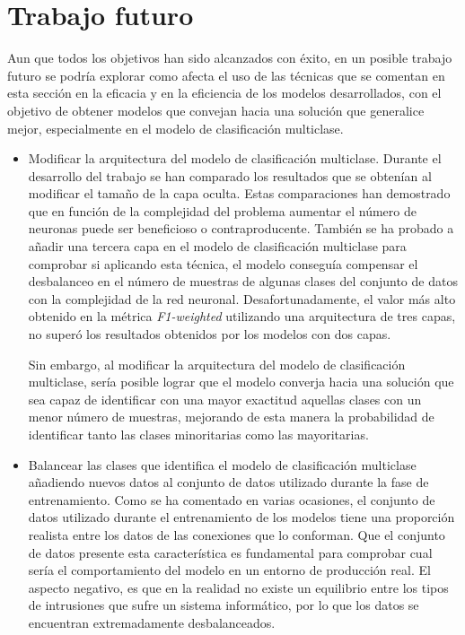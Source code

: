 \section{Trabajo futuro}
Aun que todos los objetivos han sido alcanzados con éxito, en un posible trabajo futuro se podría explorar como afecta el uso de las técnicas que se comentan en esta sección en la eficacia y en la eficiencia de los modelos desarrollados, con el objetivo de obtener modelos que convejan hacia una solución que generalice mejor, especialmente en el modelo de clasificación multiclase.

\begin{itemize}
	\item Modificar la arquitectura del modelo de clasificación multiclase. Durante el desarrollo del trabajo se han comparado los resultados que se obtenían al modificar el tamaño de la capa oculta. Estas comparaciones han demostrado que en función de la complejidad del problema aumentar el número de neuronas puede ser beneficioso o contraproducente. También se ha probado a añadir una tercera capa en el modelo de clasificación multiclase para comprobar si aplicando esta técnica, el modelo conseguía compensar el desbalanceo en el número de muestras de algunas clases del conjunto de datos con la complejidad de la red neuronal. Desafortunadamente, el valor más alto obtenido en la métrica \textit{F1-weighted} utilizando una arquitectura de tres capas, no superó los resultados obtenidos por los modelos con dos capas.
	
	Sin embargo, al modificar la arquitectura del modelo de clasificación multiclase, sería posible lograr que el modelo converja hacia una solución que sea capaz de identificar con una mayor exactitud aquellas clases con un menor número de muestras, mejorando de esta manera la probabilidad de identificar tanto las clases minoritarias como las mayoritarias.
	
	\item Balancear las clases que identifica el modelo de clasificación multiclase añadiendo nuevos datos al conjunto de datos utilizado durante la fase de entrenamiento. Como se ha comentado en varias ocasiones, el conjunto de datos utilizado durante el entrenamiento de los modelos tiene una proporción realista entre los datos de las conexiones que lo conforman. Que el conjunto de datos presente esta característica es fundamental para comprobar cual sería el comportamiento del modelo en un entorno de producción real. El aspecto negativo, es que en la realidad no existe un equilibrio entre los tipos de intrusiones que sufre un sistema informático, por lo que los datos se encuentran extremadamente desbalanceados.
	

\end{itemize}
